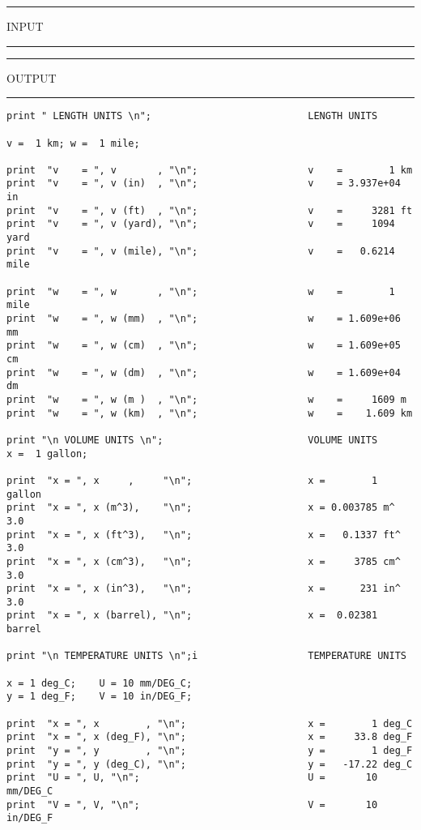 \vspace{0.15 in}
\begin{footnotesize}
\noindent
\rule{1.2 in}{0.035 in} INPUT \rule{1.2 in}{0.035 in}\hspace{0.1 in}
\rule{1.3 in}{0.035 in} OUTPUT\rule{1.3 in}{0.035 in}
\begin{verbatim}
print " LENGTH UNITS \n";                           LENGTH UNITS

v =  1 km; w =  1 mile;

print  "v    = ", v       , "\n";                   v    =        1 km
print  "v    = ", v (in)  , "\n";                   v    = 3.937e+04 in
print  "v    = ", v (ft)  , "\n";                   v    =     3281 ft
print  "v    = ", v (yard), "\n";                   v    =     1094 yard
print  "v    = ", v (mile), "\n";                   v    =   0.6214 mile

print  "w    = ", w       , "\n";                   w    =        1 mile
print  "w    = ", w (mm)  , "\n";                   w    = 1.609e+06 mm
print  "w    = ", w (cm)  , "\n";                   w    = 1.609e+05 cm
print  "w    = ", w (dm)  , "\n";                   w    = 1.609e+04 dm
print  "w    = ", w (m )  , "\n";                   w    =     1609 m
print  "w    = ", w (km)  , "\n";                   w    =    1.609 km

print "\n VOLUME UNITS \n";                         VOLUME UNITS 
x =  1 gallon;

print  "x = ", x     ,     "\n";                    x =        1 gallon
print  "x = ", x (m^3),    "\n";                    x = 0.003785 m^ 3.0
print  "x = ", x (ft^3),   "\n";                    x =   0.1337 ft^ 3.0
print  "x = ", x (cm^3),   "\n";                    x =     3785 cm^ 3.0
print  "x = ", x (in^3),   "\n";                    x =      231 in^ 3.0
print  "x = ", x (barrel), "\n";                    x =  0.02381 barrel

print "\n TEMPERATURE UNITS \n";i                   TEMPERATURE UNITS 

x = 1 deg_C;    U = 10 mm/DEG_C;   
y = 1 deg_F;    V = 10 in/DEG_F;

print  "x = ", x        , "\n";                     x =        1 deg_C
print  "x = ", x (deg_F), "\n";                     x =     33.8 deg_F
print  "y = ", y        , "\n";                     y =        1 deg_F
print  "y = ", y (deg_C), "\n";                     y =   -17.22 deg_C
print  "U = ", U, "\n";                             U =       10 mm/DEG_C
print  "V = ", V, "\n";                             V =       10 in/DEG_F


\end{verbatim}
\end{footnotesize}
